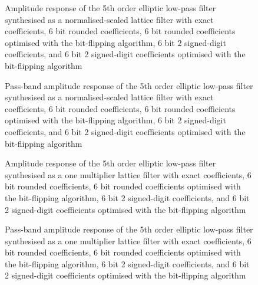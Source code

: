 \documentclass[a4paper,twoside,10pt,english]{report}
\begin{document}
\begin{figure}[!htbp]
\begin{center}
\scalebox{0.7}{}
\caption{Amplitude response of the 5th order elliptic low-pass
filter synthesised as a normalised-scaled lattice filter with exact coefficients,
6 bit rounded coefficients, 6 bit rounded coefficients optimised with the 
bit-flipping algorithm, 6 bit 2 signed-digit coefficients, and 6 bit 
2 signed-digit coefficients optimised with the bit-flipping algorithm}
\label{fig:bitflip_NS_lattice_response}
\end{center}
\end{figure}

\begin{figure}[!htbp]
\begin{center}
\scalebox{0.7}{}
\caption{Pass-band amplitude response of the 5th order elliptic low-pass
filter synthesised as a normalised-scaled lattice filter with exact coefficients,
6 bit rounded coefficients, 6 bit rounded coefficients optimised with the 
bit-flipping algorithm, 6 bit 2 signed-digit coefficients, and 6 bit 
2 signed-digit coefficients optimised with the bit-flipping algorithm}
\label{fig:bitflip_NS_lattice_passband_response}
\end{center}
\end{figure}

\begin{figure}[!htbp]
\begin{center}
\scalebox{0.7}{}
\caption{Amplitude response of the 5th order elliptic low-pass
filter synthesised as a one multiplier lattice filter with exact coefficients,
6 bit rounded coefficients, 6 bit rounded coefficients optimised with the 
bit-flipping algorithm, 6 bit 2 signed-digit coefficients, and 6 bit 
2 signed-digit coefficients optimised with the bit-flipping algorithm}
\label{fig:bitflip_OneM_lattice_response}
\end{center}
\end{figure}

\begin{figure}[!htbp]
\begin{center}
\scalebox{0.7}{}
\caption{Pass-band amplitude response of the 5th order elliptic low-pass
filter synthesised as a one multiplier lattice filter with exact coefficients,
6 bit rounded coefficients, 6 bit rounded coefficients optimised with the 
bit-flipping algorithm, 6 bit 2 signed-digit coefficients, and 6 bit 
2 signed-digit coefficients optimised with the bit-flipping algorithm}
\label{fig:bitflip_OneM_lattice_passband_response}
\end{center}
\end{figure}
\end{document}
